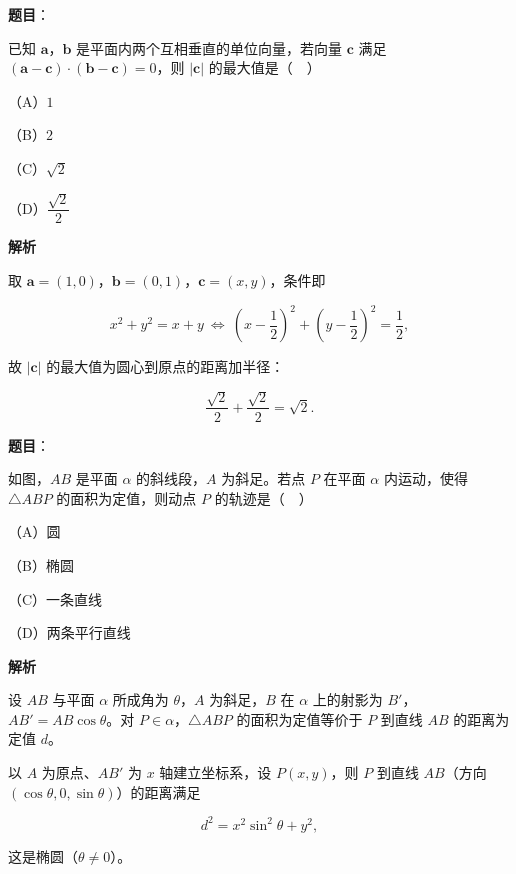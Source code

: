 \begin{answer}

\textbf{题目}：

已知 $\boldsymbol a$，$\boldsymbol b$ 是平面内两个互相垂直的单位向量，若向量 $\boldsymbol c$ 满足 $(\boldsymbol a-\boldsymbol c)\cdot(\boldsymbol b-\boldsymbol c)=0$，则 $|\boldsymbol c|$ 的最大值是（　）

（A）$1$

（B）$2$

（C）$\sqrt2$

（D）$\dfrac{\sqrt2}2$

\textbf{解析}

取 $\boldsymbol a=(1,0)$，$\boldsymbol b=(0,1)$，$\boldsymbol c=(x,y)$，条件即

\nopagebreak[4]
\[x^2+y^2=x+y\ \Longleftrightarrow\ \left(x-\frac12\right)^2+\left(y-\frac12\right)^2=\frac12,\]

故 $|\boldsymbol c|$ 的最大值为圆心到原点的距离加半径：

\nopagebreak[4]
\[\frac{\sqrt2}2+\frac{\sqrt2}2=\sqrt2.\]


\end{answer}
\begin{answer}

\textbf{题目}：

如图，$AB$ 是平面 $\alpha$ 的斜线段，$A$ 为斜足。若点 $P$ 在平面 $\alpha$ 内运动，使得 $\triangle ABP$ 的面积为定值，则动点 $P$ 的轨迹是（　）
\nopagebreak[4]
\begin{center}\end{center}
\nopagebreak[4]
（A）圆

（B）椭圆

（C）一条直线

（D）两条平行直线

\textbf{解析}

设 $AB$ 与平面 $\alpha$ 所成角为 $\theta$，$A$ 为斜足，$B$ 在 $\alpha$ 上的射影为 $B'$，$AB'=AB\cos\theta$。对 $P\in\alpha$，$\triangle ABP$ 的面积为定值等价于 $P$ 到直线 $AB$ 的距离为定值 $d$。

以 $A$ 为原点、$AB'$ 为 $x$ 轴建立坐标系，设 $P(x,y)$，则 $P$ 到直线 $AB$（方向 $(\cos\theta,0,\sin\theta)$）的距离满足

\nopagebreak[4]
\[d^2=x^2\sin^2\theta+y^2,\]

这是椭圆（$\theta\neq0$）。


\end{answer}
